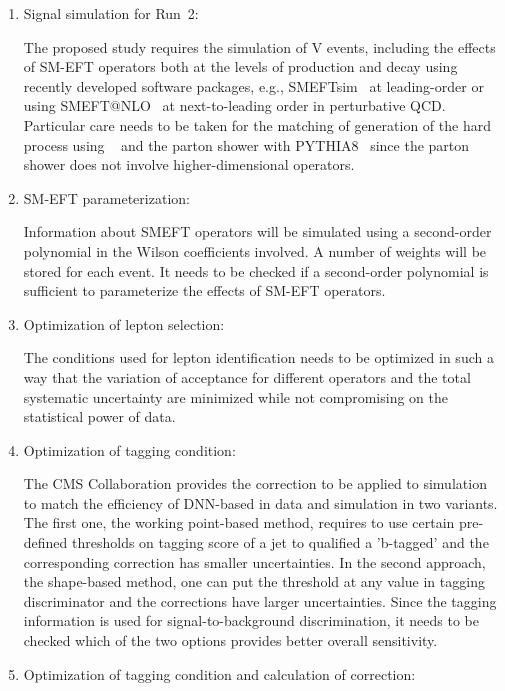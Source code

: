 \documentclass[a4paper,11pt]{article}
\newcommand{\Pb}{{{\Pqb}}\xspace}
\renewcommand{\PV}{{{{V}}}\xspace}
\newcommand{\VH}{{{\PV}{\PH}}\xspace}
\begin{document}
\begin{enumerate}

\item Signal simulation for Run~2:

The proposed study requires the simulation of \VH events, including the effects of SM-EFT operators both at the levels of production and decay using recently developed software packages, e.g., SMEFTsim~\cite{Brivio:2020onw} at leading-order or using SMEFT@NLO~\cite{Degrande:2020evl} at next-to-leading order in perturbative QCD. 
Particular care needs to be taken for the matching of generation of the hard process using {\MGvATNLO}~\cite{Alwall:2014hca} and the parton shower with PYTHIA8~\cite{Sjostrand:2014zea} 
since the parton shower does not involve higher-dimensional operators. 

\item SM-EFT parameterization:

Information about SMEFT operators will be simulated using a second-order polynomial in the Wilson coefficients involved. A number of weights will be stored for each event. 
It needs to be checked if a second-order polynomial is sufficient to parameterize the effects of SM-EFT operators.

\item Optimization of lepton selection:

The conditions used for lepton identification needs to be optimized in such a way that the variation of acceptance for different operators and the total systematic uncertainty are minimized while not compromising on the statistical power of data. 

\item Optimization of \Pb tagging condition: 

The CMS Collaboration provides the correction to be applied to simulation to match the efficiency of DNN-based \Pb in data and simulation in two variants. 
The first one, the working point-based method, requires to use certain pre-defined thresholds on \Pb tagging score of a jet to qualified a 'b-tagged' and the corresponding correction has smaller uncertainties. 
In the second approach, the shape-based method, one can put the threshold at any value in \Pb tagging discriminator and the corrections have larger uncertainties. Since the \Pb tagging information is used for signal-to-background discrimination, it needs to be checked which of the two options provides better overall sensitivity.  

\item Optimization of \PH tagging condition and calculation of correction:


\end{enumerate}
\end{document}

